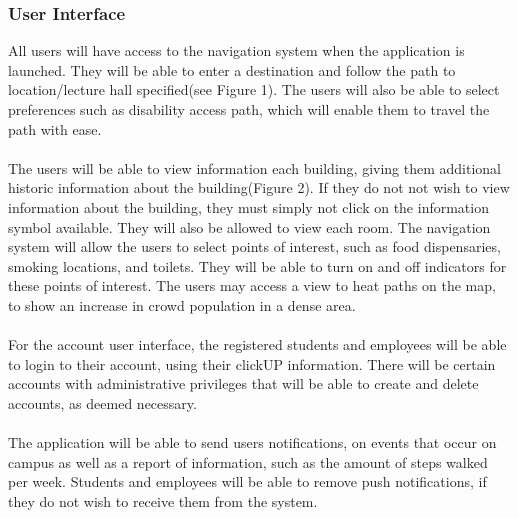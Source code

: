 \documentclass{article}
\begin{document}
            \subsubsection{User Interface}
	    {All users will have access to the navigation system when the application is launched.
They will be able to enter a destination and follow the path to location/lecture hall specified(see Figure 1).
The users will also be able to select preferences such as disability access path, which will enable them to travel the path with ease.\\\\
The users will be able to view information each building, giving them additional historic information about the building(Figure 2). If they do not not wish to 
view information about the building, they must simply not click on the information symbol available.
They will also be allowed to view each room. The navigation system will allow the users to select points of interest, such as food dispensaries, 
smoking locations, and toilets. They will be able to turn on and off indicators for these points of interest.
The users may access a view to heat paths on the map, to show an increase in crowd population in a dense area.\\\\
For the account user interface, the registered students and employees will be able to login to their account, using their clickUP information.
There will be certain accounts with administrative privileges that will be able to create and delete accounts, as deemed necessary.\\\\
The application will be able to send users notifications, on events that occur on campus as well as a report of information, such as the amount of 
steps walked per week. Students and employees will be able to remove push notifications, if they do not wish to receive them from the system.\\\\
}
\end{document}
